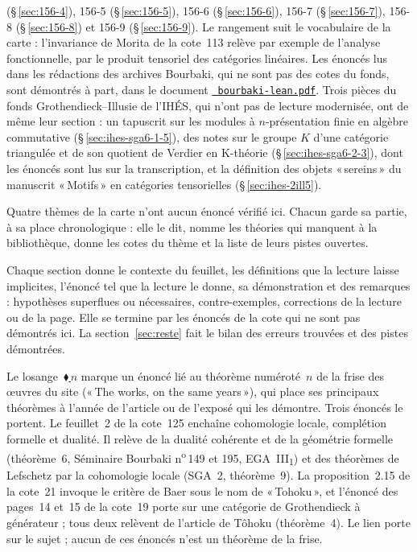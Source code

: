 \documentclass[11pt]{article}
\newcommand{\q}[1]{«\,#1\,»}
\newcommand{\lie}[1]{\,\href{https://grothendieck.commutator.io/timeline/\#works}{\textcolor{frise}{\ensuremath{\blacklozenge}\,\textup{#1}}}}
\theoremstyle{plain}
\theoremstyle{definition}
\theoremstyle{plain}
\theoremstyle{definition}
\theoremstyle{remark}
\renewcommand{\_}{\bkunderscore\allowbreak}
\let\origtexttt\texttt
\renewcommand{\texttt}[1]{\origtexttt{\XeTeXinterchartokenstate=1 #1}}
\begin{document}
(§\,\ref{sec:156-4}), 156-5 (§\,\ref{sec:156-5}), 156-6 (§\,\ref{sec:156-6}), 156-7 (§\,\ref{sec:156-7}), 156-8 (§\,\ref{sec:156-8}) et 156-9 (§\,\ref{sec:156-9}). Le rangement suit le vocabulaire de la carte : l'invariance de Morita de la cote~113 relève par exemple de l'analyse fonctionnelle, par le produit tensoriel des catégories linéaires. Les énoncés lus dans les rédactions des archives Bourbaki, qui ne sont pas des cotes du fonds, sont démontrés à part, dans le document \href{https://grothendieck.commutator.io/article/bourbaki-lean.pdf}{\texttt{bourbaki-lean.pdf}}. Trois pièces du fonds Grothendieck--Illusie de l'IHÉS, qui n'ont pas de lecture modernisée, ont de même leur section : un tapuscrit sur les modules à $n$-présentation finie en algèbre commutative (§\,\ref{sec:ihes-sga6-1-5}), des notes sur le groupe $K$ d'une catégorie triangulée et de son quotient de Verdier en K-théorie (§\,\ref{sec:ihes-sga6-2-3}), dont les énoncés sont lus sur la transcription, et la définition des objets \q{sereins} du manuscrit \q{Motifs} en catégories tensorielles (§\,\ref{sec:ihes-2ill5}).

Quatre thèmes de la carte n'ont aucun énoncé vérifié ici. Chacun garde sa partie, à sa place chronologique : elle le dit, nomme les théories qui manquent à la bibliothèque, donne les cotes du thème et la liste de leurs pistes ouvertes.

Chaque section donne le contexte du feuillet, les définitions que la lecture laisse implicites, l'énoncé tel que la lecture le donne, sa démonstration et des remarques : hypothèses superflues ou nécessaires, contre-exemples, corrections de la lecture ou de la page. Elle se termine par les énoncés de la cote qui ne sont pas démontrés ici. La section~\ref{sec:reste} fait le bilan des erreurs trouvées et des pistes démontrées.

Le losange \lie{$n$} marque un énoncé lié au théorème numéroté~$n$ de la frise des œuvres du site (\q{The works, on the same years}), qui place ses principaux théorèmes à l'année de l'article ou de l'exposé qui les démontre. Trois énoncés le portent. Le feuillet~2 de la cote~125 enchaîne cohomologie locale, complétion formelle et dualité. Il relève de la dualité cohérente et de la géométrie formelle (théorème~6, Séminaire Bourbaki n\textsuperscript{o}\,149 et 195, EGA~III\textsubscript{1}) et des théorèmes de Lefschetz par la cohomologie locale (SGA~2, théorème~9). La proposition~2.15 de la cote~21 invoque le critère de Baer sous le nom de \q{Tohoku}, et l'énoncé des pages~14 et~15 de la cote~19 porte sur une catégorie de Grothendieck à générateur ; tous deux relèvent de l'article de Tôhoku (théorème~4). Le lien porte sur le sujet ; aucun de ces énoncés n'est un théorème de la frise.
\end{document}
